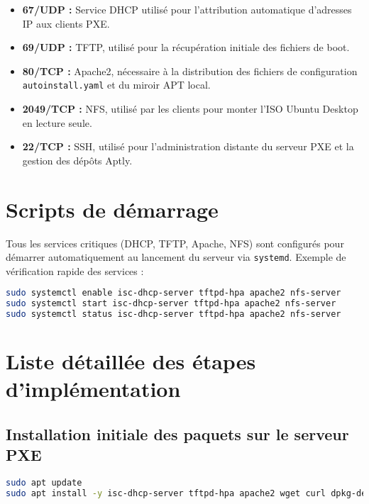 \documentclass[a4paper,12pt]{article}
\begin{document}
\begin{itemize}
\item \textbf{67/UDP :} Service DHCP utilisé pour l'attribution automatique d’adresses IP aux clients PXE.
\item \textbf{69/UDP :} TFTP, utilisé pour la récupération initiale des fichiers de boot.
\item \textbf{80/TCP :} Apache2, nécessaire à la distribution des fichiers de configuration \texttt{autoinstall.yaml} et du miroir APT local.
\item \textbf{2049/TCP :} NFS, utilisé par les clients pour monter l'ISO Ubuntu Desktop en lecture seule.
\item \textbf{22/TCP :} SSH, utilisé pour l’administration distante du serveur PXE et la gestion des dépôts Aptly.
\end{itemize}

\section{Scripts de démarrage}
Tous les services critiques (DHCP, TFTP, Apache, NFS) sont configurés pour démarrer automatiquement au lancement du serveur via \texttt{systemd}. Exemple de vérification rapide des services :

\begin{lstlisting}[language=bash]
sudo systemctl enable isc-dhcp-server tftpd-hpa apache2 nfs-server
sudo systemctl start isc-dhcp-server tftpd-hpa apache2 nfs-server
sudo systemctl status isc-dhcp-server tftpd-hpa apache2 nfs-server
\end{lstlisting}

\section{Liste détaillée des étapes d’implémentation}

\subsection{Installation initiale des paquets sur le serveur PXE}

\begin{lstlisting}[language=bash]
sudo apt update
sudo apt install -y isc-dhcp-server tftpd-hpa apache2 wget curl dpkg-dev xorriso openssh-server nfs-kernel-server aptly gnupg2 pxelinux syslinux-common equivs
\end{lstlisting}
\end{document}
